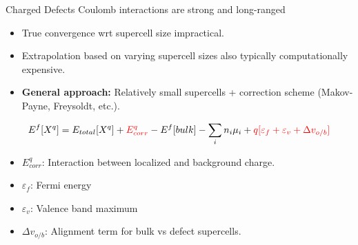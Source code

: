 \documentclass[aspectratio=169]{beamer}
\begin{document}
\begin{frame}{Charged Defects}
Coulomb interactions are strong and long-ranged
\begin{itemize}
    \item True convergence wrt supercell size impractical.
    \item Extrapolation based on varying supercell sizes also typically computationally expensive.
    \item \textbf{General approach:} Relatively small supercells + correction scheme (Makov-Payne, Freysoldt, etc.).\cite{komsaComparisonVariousFinitesize2012}
\end{itemize}

\begin{equation*}
E^f[X^q] = E_{total}[X^q] +\textcolor{red}{E^q_{corr}} - E^f[bulk] - \sum_i n_i \mu_i +\textcolor{red}{q[\varepsilon_f + \varepsilon_v +\Delta v_{o/b}]}
\end{equation*} 
\begin{itemize}
    \item $E^q_{corr}$: Interaction between localized and background charge.
    \item $\varepsilon_f$: Fermi energy
    \item $\varepsilon_v$: Valence band maximum
    \item $\Delta v_{o/b}$: Alignment term for bulk vs defect supercells.
\end{itemize}

\end{frame} 
\end{document}
